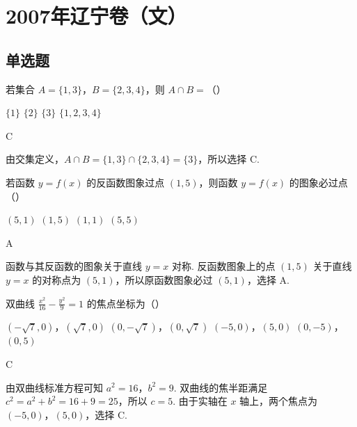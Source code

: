 \chapter{2007年辽宁卷（文）}

\section{单选题}

\begin{problem}
若集合 \(A = \{1, 3\}\)，\(B = \{2, 3, 4\}\)，则 \(A \cap B =\)（\quad）

\choices
    {\(\{1\}\)}
    {\(\{2\}\)}
    {\(\{3\}\)}
    {\(\{1, 2, 3, 4\}\)}
\end{problem}

\begin{answer}
C
\end{answer}

\begin{solution}
由交集定义，\(A\cap B=\{1,3\}\cap\{2,3,4\}=\{3\}\)，所以选择 C.
\end{solution}

\begin{problem}
若函数 \(y = f(x)\) 的反函数图象过点 \((1, 5)\)，则函数 \(y = f(x)\) 的图象必过点（\quad）

\choices
    {\((5, 1)\)}
    {\((1, 5)\)}
    {\((1, 1)\)}
    {\((5, 5)\)}
\end{problem}

\begin{answer}
A
\end{answer}

\begin{solution}
函数与其反函数的图象关于直线 \(y=x\) 对称. 反函数图象上的点 \((1,5)\) 关于直线 \(y=x\) 的对称点为 \((5,1)\)，所以原函数图象必过 \((5,1)\)，选择 A.
\end{solution}

\begin{problem}
双曲线 \(\frac{x^2}{16} - \frac{y^2}{9} = 1\) 的焦点坐标为（\quad）

\choices
    {\((-\sqrt{7}, 0)\)，\((\sqrt{7}, 0)\)}
    {\((0, -\sqrt{7})\)，\((0, \sqrt{7})\)}
    {\((-5, 0)\)，\((5, 0)\)}
    {\((0, -5)\)，\((0, 5)\)}
\end{problem}

\begin{answer}
C
\end{answer}

\begin{solution}
由双曲线标准方程可知 \(a^2=16\)，\(b^2=9\). 双曲线的焦半距满足
\(c^2=a^2+b^2=16+9=25\)，所以 \(c=5\). 由于实轴在 \(x\) 轴上，两个焦点为 \((-5,0)\)，\((5,0)\)，选择 C.
\end{solution}

